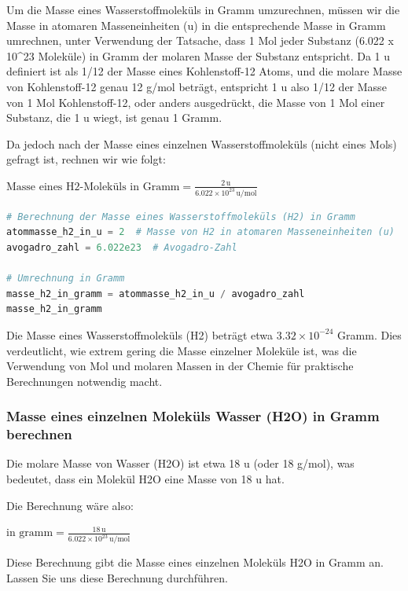 \documentclass{vorlage-design-main}
\begin{document}
Um die Masse eines Wasserstoffmoleküls in Gramm umzurechnen, müssen wir
die Masse in atomaren Masseneinheiten (u) in die entsprechende Masse in
Gramm umrechnen, unter Verwendung der Tatsache, dass 1 Mol jeder
Substanz (6.022 x 10\^{}23 Moleküle) in Gramm der molaren Masse der
Substanz entspricht. Da 1 u definiert ist als 1/12 der Masse eines
Kohlenstoff-12 Atoms, und die molare Masse von Kohlenstoff-12 genau 12
g/mol beträgt, entspricht 1 u also 1/12 der Masse von 1 Mol
Kohlenstoff-12, oder anders ausgedrückt, die Masse von 1 Mol einer
Substanz, die 1 u wiegt, ist genau 1 Gramm.

Da jedoch nach der Masse eines einzelnen Wasserstoffmoleküls (nicht
eines Mols) gefragt ist, rechnen wir wie folgt:

$\text{Masse eines H2-Moleküls in Gramm} = \frac{2 \, \text{u}}{6.022 \times 10^{23} \, \text{u/mol}}$

\begin{lstlisting}[language=Python]
# Berechnung der Masse eines Wasserstoffmoleküls (H2) in Gramm
atommasse_h2_in_u = 2  # Masse von H2 in atomaren Masseneinheiten (u)
avogadro_zahl = 6.022e23  # Avogadro-Zahl

# Umrechnung in Gramm
masse_h2_in_gramm = atommasse_h2_in_u / avogadro_zahl
masse_h2_in_gramm
\end{lstlisting}

Die Masse eines Wasserstoffmoleküls (H2) beträgt etwa
$3.32 \times 10^{-24}$ Gramm. Dies verdeutlicht, wie extrem gering die
Masse einzelner Moleküle ist, was die Verwendung von Mol und molaren
Massen in der Chemie für praktische Berechnungen notwendig macht.

\hypertarget{masse-eines-einzelnen-molekuxfcls-wasser-h2o-in-gramm-berechnen}{%
\subsubsection{Masse eines einzelnen Moleküls Wasser (H2O) in Gramm
berechnen}\label{masse-eines-einzelnen-molekuels-wasser-h2o-in-gramm-berechnen}}

Die molare Masse von Wasser (H2O) ist etwa 18 u (oder 18 g/mol), was
bedeutet, dass ein Molekül H2O eine Masse von 18 u hat.

Die Berechnung wäre also:

$\text{in gramm} = \frac{18 \, \text{u}}{6.022 \times 10^{23} \, \text{u/mol}}$

Diese Berechnung gibt die Masse eines einzelnen Moleküls H2O in Gramm
an. Lassen Sie uns diese Berechnung durchführen.
\end{document}
